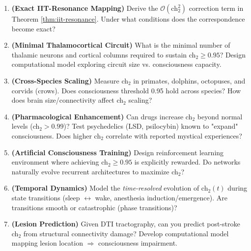 \begin{enumerate}
\item \textbf{(Exact IIT-Resonance Mapping)} Derive the $\mathcal{O}(\text{ch}_2^2)$ correction term in Theorem \ref{thm:iit-resonance}. Under what conditions does the correspondence become exact?

\item \textbf{(Minimal Thalamocortical Circuit)} What is the minimal number of thalamic neurons and cortical columns required to sustain ch$_2 \geq 0.95$? Design computational model exploring circuit size vs. consciousness capacity.

\item \textbf{(Cross-Species Scaling)} Measure ch$_2$ in primates, dolphins, octopuses, and corvids (crows). Does consciousness threshold 0.95 hold across species? How does brain size/connectivity affect ch$_2$ scaling?

\item \textbf{(Pharmacological Enhancement)} Can drugs increase ch$_2$ beyond normal levels (ch$_2 > 0.99$)? Test psychedelics (LSD, psilocybin) known to "expand" consciousness. Does higher ch$_2$ correlate with reported mystical experiences?

\item \textbf{(Artificial Consciousness Training)} Design reinforcement learning environment where achieving ch$_2 \geq 0.95$ is explicitly rewarded. Do networks naturally evolve recurrent architectures to maximize ch$_2$?

\item \textbf{(Temporal Dynamics)} Model the \textit{time-resolved} evolution of ch$_2(t)$ during state transitions (sleep $\leftrightarrow$ wake, anesthesia induction/emergence). Are transitions smooth or catastrophic (phase transitions)?

\item \textbf{(Lesion Prediction)} Given DTI tractography, can you predict post-stroke ch$_2$ from structural connectivity damage? Develop computational model mapping lesion location $\Rightarrow$ consciousness impairment.
\end{enumerate}
